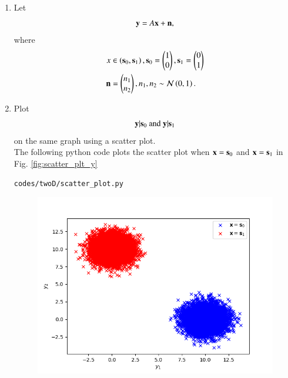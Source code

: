 \begin{enumerate}[label=\thesection.\arabic*.,ref=\thesection.\theenumi]
\item Let 
\begin{equation}
\mathbf{y} = A\mathbf{x} + \mathbf{n},
\end{equation}
where 
\begin{align}
x &\in \left(\mathbf{s}_0,\mathbf{s}_1\right), 
\mathbf{s}_0 = 
\begin{pmatrix}
1 
\\
0
\end{pmatrix},
\mathbf{s}_1 = 
\begin{pmatrix}
0 
\\
1
\end{pmatrix}
\\
\mathbf{n} &= 
\begin{pmatrix}
n_1
\\
n_2
\end{pmatrix},
n_1,n_2 \sim \mathcal{N}\left(0,1\right).
\end{align}
%
\item
\label{ch5_fsk}
Plot 
%
\begin{equation}
\mathbf{y}|\mathbf{s}_0 \text{ and } \mathbf{y}|\mathbf{s}_1
\end{equation}
%
on the same graph using a scatter plot.
\\
\clearpage
\solution The following python code plots the scatter plot when $\mathbf{x} = \mathbf{s}_0$ and $\mathbf{x} = \mathbf{s}_1$ in Fig. \ref{fig:scatter_plt_y}
\begin{lstlisting}
codes/twoD/scatter_plot.py
\end{lstlisting}
\begin{figure}
\centering
\includegraphics[width=\columnwidth]{./figs/twoD/scatter_plot.png}

\end{figure}
\end{enumerate}
